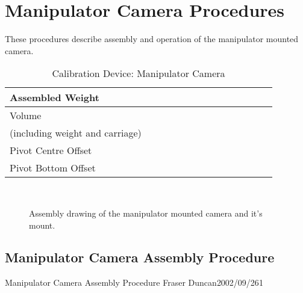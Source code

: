 

  
\section{Manipulator Camera Procedures}

  These procedures describe assembly and operation of the manipulator
mounted camera.

\begin{table}[htb]
\begin{center}
\begin{tabular}{|l|r|}
\hline
Assembled Weight & ~~~~~~~~~~~~~~~~~~~~~\\
\hline
Volume           & ~~~~~~~~~~~~~~~~~~~~~\\
(including weight and carriage) & \\
\hline
Pivot Centre Offset & \\
\hline
Pivot Bottom Offset & \\
\hline
\end{tabular}
\caption[Calibration Device:Manipulator Camera]
  {Calibration Device: Manipulator Camera
  }
\end{center}
\end{table}



\clearpage
\begin{figure}
\begin{center}
~\\
\caption[Assembly drawing of the manipulator mounted camera and mount]
        {Assembly drawing of the manipulator mounted camera and
         it's mount.
        } 
        
\end{center}
\end{figure}




\clearpage

\subsection{Manipulator Camera Assembly Procedure}
             {Manipulator Camera Assembly Procedure}
             {Fraser Duncan}{2002/09/26}{1}

